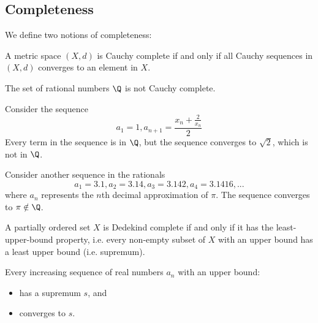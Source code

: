 
\subsection{Completeness}
We define two notions of completeness:
\begin{definition}
  A metric space $(X, d)$ is Cauchy complete if and only if all Cauchy sequences in $(X, d)$ converges to an element in $X$.
\end{definition}
\begin{eg}
  The set of rational numbers $\Q$ is not Cauchy complete. 
  
  Consider the sequence
  \[
    a_1 = 1, a_{n + 1} = \frac{x_n + \frac{2}{x_n}}{2}
  \]
  Every term in the sequence is in $\Q$, but the sequence converges to $\sqrt{2}$, which is not in $\Q$.

  Consider another sequence in the rationals
  \[
    a_1 = 3.1, a_2 = 3.14, a_3 = 3.142, a_4 = 3.1416, ...
  \]
  where $a_n$ represents the $n$th decimal approximation of $\pi$. The sequence converges to $\pi \notin \Q$.
\end{eg}
\begin{definition}
  A partially ordered set $X$ is Dedekind complete if and only if it has the least-upper-bound property, i.e. every non-empty subset of $X$ with an upper bound has a least upper bound (i.e. supremum).
\end{definition}
\begin{theorem}
  Every increasing sequence of real numbers $a_n$ with an upper bound:
  \begin{itemize}
    \item has a supremum $s$, and
    \item converges to $s$.
  \end{itemize}
\end{theorem}
